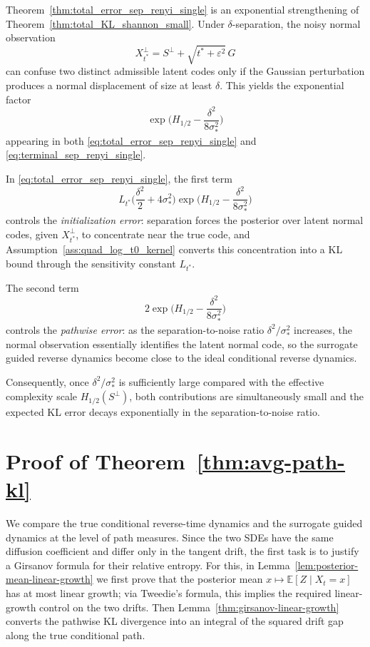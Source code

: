 \documentclass[twoside,11pt]{article}
\newcommand{\E}{\mathbb{E}}
\numberwithin{equation}{section}
\begin{document}
\begin{remark}
Theorem~\ref{thm:total_error_sep_renyi_single} is an exponential strengthening of
Theorem~\ref{thm:total_KL_shannon_small}. Under \(\delta\)-separation, the noisy normal
observation
\[
X_{t^*}^\perp = S^\perp + \sqrt{t^*+\varepsilon^2}\,G
\]
can confuse two distinct admissible latent codes only if the Gaussian perturbation produces
a normal displacement of size at least \(\delta\). This yields the exponential factor
\[
\exp\!\Big(H_{1/2}-\frac{\delta^2}{8\sigma_*^2}\Big)
\]
appearing in both \eqref{eq:total_error_sep_renyi_single} and
\eqref{eq:terminal_sep_renyi_single}.

In \eqref{eq:total_error_sep_renyi_single}, the first term
\[
L_{t^*}\Big(\frac{\delta^2}{2}+4\sigma_*^2\Big)
\exp\!\Big(H_{1/2}-\frac{\delta^2}{8\sigma_*^2}\Big)
\]
controls the \emph{initialization error}: separation forces the posterior over latent normal
codes, given \(X_{t^*}^\perp\), to concentrate near the true code, and
Assumption~\ref{ass:quad_log_t0_kernel} converts this concentration into a KL bound through
the sensitivity constant \(L_{t^*}\).

The second term
\[
2\exp\!\Big(H_{1/2}-\frac{\delta^2}{8\sigma_*^2}\Big)
\]
controls the \emph{pathwise error}: as the separation-to-noise ratio
\(\delta^2/\sigma_*^2\) increases, the normal observation essentially identifies the latent
normal code, so the surrogate guided reverse dynamics become close to the ideal conditional
reverse dynamics.

Consequently, once \(\delta^2/\sigma_*^2\) is sufficiently large compared with the effective
complexity scale \(H_{1/2}(S^\perp)\), both contributions are simultaneously small and the
expected KL error decays exponentially in the separation-to-noise ratio.
\end{remark}
\newpage


\appendix

\section{ Proof of Theorem~\ref{thm:avg-path-kl} }

\noindent

We compare the true conditional reverse-time dynamics and the surrogate guided dynamics at the level of path measures. Since the two SDEs have the same diffusion coefficient and differ only in the tangent drift, the first task is to justify a Girsanov formula for their relative entropy. For this, in Lemma~\ref{lem:posterior-mean-linear-growth} we first prove that the posterior mean \(x\mapsto \E[Z\mid X_t=x]\) has at most linear growth; via Tweedie’s formula, this implies the required linear-growth control on the two drifts. Then Lemma~\ref{thm:girsanov-linear-growth} converts the pathwise KL divergence into an integral of the squared drift gap along the true conditional path. 
\end{document}
